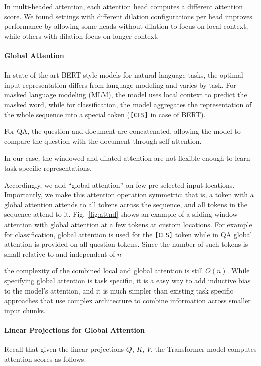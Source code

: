 In multi-headed attention, each attention head computes a different attention score.  We found settings with different dilation configurations per head improves performance by allowing some heads without dilation to focus on local context, while others with dilation focus on longer context.

\paragraph{Global Attention} 

In state-of-the-art BERT-style models for natural language tasks, the optimal input representation differs from language modeling and varies by task. For masked language modeling (MLM), the model uses local context to predict the masked word, while for classification, the model aggregates the representation of the whole sequence into a special token (\texttt{[CLS]} in case of BERT).

For QA, the question and document are concatenated, allowing the model to compare the question with the document through self-attention.

In our case, the windowed and dilated attention are not flexible enough to learn task-specific representations.

Accordingly, we add ``global attention'' on few pre-selected input locations. Importantly, we make this attention operation symmetric: that is, a token with a global attention attends to all tokens across the sequence, and all tokens in the sequence attend to it. 
Fig.~\ref{fig:attnd} shows an example of a sliding window attention with global attention at a few tokens at custom locations. For example for classification, global attention is used for the \texttt{[CLS]} token while in QA global attention is provided on all question tokens. Since the number of such tokens is small relative to and independent of $n$

the complexity of the combined local and global attention is still $O(n)$. While specifying global attention is task specific, it is a easy way to add inductive bias to the model's attention, and it is much simpler than existing task specific approaches that use complex architecture to combine information across smaller input chunks.

\paragraph{Linear Projections for Global Attention} Recall that given the linear projections $Q$, $K$, $V$, the Transformer model \cite{Vaswani2017AttentionIA} computes attention scores as follows:

